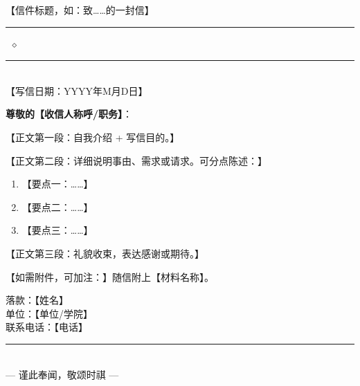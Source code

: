 \documentclass[12pt,a4paper]{article}
\begin{document}
\color{ink}

\begin{tcolorbox}[colback=lightbg, colframe=deepblue, boxrule=1pt,
                  arc=2mm, left=6mm, right=6mm, top=4mm, bottom=4mm]
  \centering
  {\color{deepblue}\Large\heiti【信件标题，如：致……的一封信】}\\[0.6em]
  \textcolor{softgold}{\rule{0.4\textwidth}{1pt}\ $\diamond$\ \rule{0.4\textwidth}{1pt}}\\[0.5em]
  {\small\color{gray}【写信日期：YYYY年M月D日】}
\end{tcolorbox}

\vspace{1.4em}

\noindent\textbf{\large 尊敬的【收信人称呼/职务】}：\par
\vspace{0.4em}

{\color{ink}【正文第一段：自我介绍 + 写信目的。】}\par

{\color{ink}【正文第二段：详细说明事由、需求或请求。可分点陈述：】}

\begin{enumerate}[leftmargin=2.2em, itemsep=0.4em]
  \item 【要点一：……】
  \item 【要点二：……】
  \item 【要点三：……】
\end{enumerate}

{\color{ink}【正文第三段：礼貌收束，表达感谢或期待。】}\par

{\color{ink}【如需附件，可加注：】随信附上【材料名称】。}

\vspace{1.6em}
\begin{flushright}
  {\heiti 落款：【姓名】}\\[0.5em]
  {\small 单位：【单位/学院】}\\[0.2em]
  {\small\color{gray}联系电话：【电话】}
\end{flushright}

\vspace{2.5em}
\begin{center}
  \textcolor{softgold}{\rule{0.6\textwidth}{0.6pt}}\\[0.3em]
  {\footnotesize\color{gray} — 谨此奉闻，敬颂时祺 —}
\end{center}
\end{document}
